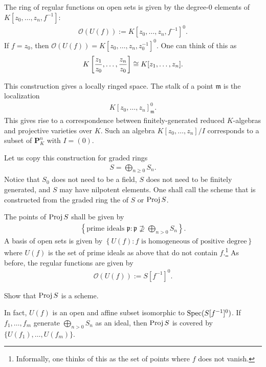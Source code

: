\documentclass [11 pt, oneside] {article}
\begin{document}
The ring of regular functions on open sets is given by the degree-$0$ elements of $K[z_0,\hdots, z_n,f^{-1}]$:
\begin{align*}
	\mathscr{O}(U(f)) := K[z_0,\hdots, z_n,f^{-1}]^0.
\end{align*}
If $f=z_0$, then $\mathscr{O}(U(f)) =K[z_0,\hdots, z_n,z_0^{-1}]^0$. One can think of this as
\begin{align*}
	K \left[ \frac{z_1}{z_0}, \hdots, \frac{z_n}{z_0} \right] \cong K[z_1,\hdots,z_n]. 
\end{align*}

This construction gives a locally ringed space. The stalk of a point $\mathfrak{m}$ is the localization
\begin{align*}
	K[z_0,\hdots, z_n]^0_{\mathfrak{m}}.
\end{align*}
This gives rise to a correspondence between finitely-generated reduced $K$-algebras and projective varieties over $K$. Such an algebra $K[z_0,\hdots, z_n]/I$ corresponds to a subset of $\mathbf{P}^n_K$ with $I=(0)$.

Let us copy this construction for graded rings
\begin{align*}
	S = \bigoplus_{n\ge 0}S_n.
\end{align*}
Notice that $S_0$ does not need to be a field, $S$ does not need to be finitely generated, and $S$ may have nilpotent elements.
One shall call the scheme that is constructed from the graded ring the  of $S$ or {$\operatorname{Proj} S$}.

The points of $\operatorname{Proj} S$ shall be given by
\begin{align*}
	\left\{ \textrm{prime ideals $\mathfrak{p}$} : \mathfrak{p} \nsupseteq \bigoplus_{n>0}S_n\right\}. 
\end{align*}
A basis of open sets is given by $\left\{U(f) : \textrm{$f$ is homogeneous of positive degree}\right\}$ where $U(f)$ is the set of prime ideals as above that do not contain $f$.\footnote{Informally, one thinks of this as the set of points where $f$ does not vanish.} As before, the regular functions are given by
\begin{align*}
	\mathscr{O}(U(f)) := S[f ^{-1}]^0.
\end{align*}

\begin{exercise}\label{}\text{}
Show that $\operatorname{Proj} S$ is a scheme.
\end{exercise}

In fact, $U(f)$ is an open and affine subset isomorphic to $\operatorname{Spec}(S[f^{-1}]^0)$. If $f_1,\hdots, f_m$ generate $\bigoplus_{n>0}S_n$ as an ideal, then $\operatorname{Proj} S$ is covered by $\{U(f_1),\hdots,U(f_m)\}$. 
\end{document}
